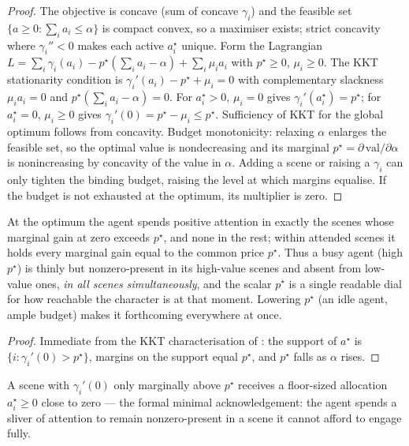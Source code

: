 \documentclass[11pt,twocolumn,a4paper]{article}
\newcommand{\att}{\alpha}            %
\newcommand{\price}{p^{\star}}       %
\newcommand{\alloc}{a}               %
\begin{document}
\begin{proof}
The objective is concave (sum of concave $\gamma_i$) and the feasible set
$\{\alloc\ge0:\sum_i a_i\le\att\}$ is compact convex, so a maximiser
exists; strict concavity where $\gamma_i''<0$ makes each active $a_i^\star$
unique. Form the Lagrangian $L=\sum_i\gamma_i(a_i)-\price(\sum_i
a_i-\att)+\sum_i\mu_i a_i$ with $\price\ge0$, $\mu_i\ge0$. The KKT
stationarity condition is $\gamma_i'(a_i)-\price+\mu_i=0$ with
complementary slackness $\mu_i a_i=0$ and $\price(\sum_i a_i-\att)=0$. For
$a_i^\star>0$, $\mu_i=0$ gives $\gamma_i'(a_i^\star)=\price$; for
$a_i^\star=0$, $\mu_i\ge0$ gives $\gamma_i'(0)=\price-\mu_i\le\price$.
Sufficiency of KKT for the global optimum follows from concavity. Budget
monotonicity: relaxing $\att$ enlarges the feasible set, so the optimal
value is nondecreasing and its marginal $\price=\partial\,\mathrm{val}/
\partial\att$ is nonincreasing by concavity of the value in $\att$. Adding
a scene or raising a $\gamma_i$ can only tighten the binding budget,
raising the level at which margins equalise. If the budget is not
exhausted at the optimum, its multiplier is zero.
\end{proof}

\begin{corollary}
\label{cor:preoccupied}
At the optimum the agent spends positive attention in exactly the scenes
whose marginal gain at zero exceeds $\price$, and none in the rest; within
attended scenes it holds every marginal gain equal to the common price
$\price$. Thus a busy agent (high $\price$) is thinly but nonzero-present
in its high-value scenes and absent from low-value ones, \emph{in all
scenes simultaneously}, and the scalar $\price$ is a single readable dial
for how reachable the character is at that moment. Lowering $\price$ (an
idle agent, ample budget) makes it forthcoming everywhere at once.
\end{corollary}

\begin{proof}
Immediate from the KKT characterisation of : the
support of $\alloc^\star$ is $\{i:\gamma_i'(0)>\price\}$, margins on the
support equal $\price$, and $\price$ falls as $\att$ rises.
\end{proof}

\begin{corollary}
\label{cor:token}
A scene with $\gamma_i'(0)$ only marginally above $\price$ receives a
floor-sized allocation $a_i^\star\ge0$ close to zero --- the formal
minimal acknowledgement: the agent spends a sliver of attention to remain
nonzero-present in a scene it cannot afford to engage fully.
\end{corollary}
\end{document}
